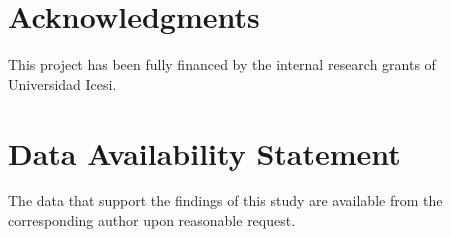 \documentclass[%
 aip,
 numerical,
 jcp,
 floatfix,
rsi,%
amsmath,amssymb,
reprint,%
author-year%
]{revtex4-1}
\begin{document}
\section{Acknowledgments}

This project has been fully financed by the internal research grants of Universidad Icesi. 

\section{Data Availability Statement}

The data that support the findings of this study are available from the corresponding author upon reasonable request.
%





\end{document}
